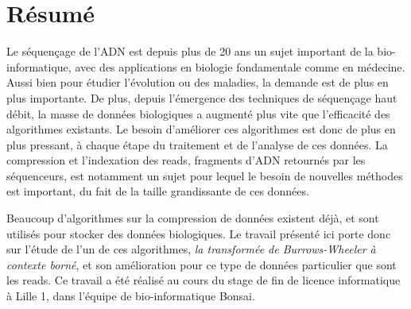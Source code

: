\section*{Résumé} %

Le séquençage de l'ADN est depuis plus de 20 ans un sujet important de la bio-informatique, avec des applications en biologie fondamentale comme en médecine. Aussi bien pour étudier l'évolution ou des maladies, la demande est de plus en plus importante. De plus, depuis l'émergence des techniques de séquençage haut débit, la masse de données biologiques a augmenté plus vite que l'efficacité des algorithmes existants. Le besoin d'améliorer ces algorithmes est donc de plus en plus pressant, à chaque étape du traitement et de l'analyse de ces données. La compression et l'indexation des reads, fragments d'ADN retournés par les séquenceurs, est notamment un sujet pour lequel le besoin de nouvelles méthodes est important, du fait de la taille grandissante de ces données.

Beaucoup d'algorithmes sur la compression de données existent déjà, et sont utilisés pour stocker des données biologiques. Le travail présenté ici porte donc sur l'étude de l'un de ces algorithmes, \textit{la transformée de Burrows-Wheeler à contexte borné}, et son amélioration pour ce type de données particulier que sont les reads. Ce travail a été réalisé au cours du stage de fin de licence informatique à Lille 1, dans l'équipe de bio-informatique Bonsai.





